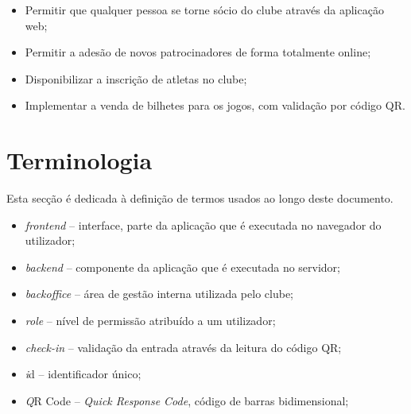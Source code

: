\begin{itemize}
    \item Permitir que qualquer pessoa se torne sócio do clube através da aplicação web;
    \item Permitir a adesão de novos patrocinadores de forma totalmente online;
    \item Disponibilizar a inscrição de atletas no clube;
    \item Implementar a venda de bilhetes para os jogos, com validação por código QR.
\end{itemize}

%
%
\section{Terminologia} \label{sec13}

Esta secção é dedicada à definição de termos usados ao longo deste documento.

\begin{itemize}
    \item \textit{frontend} -- interface, parte da aplicação que é executada no navegador do utilizador;
    \item \textit{backend} -- componente da aplicação que é executada no servidor;
    \item \textit{backoffice} -- área de gestão interna utilizada pelo clube;
    \item \textit{role} -- nível de permissão atribuído a um utilizador;
    \item \textit{check-in} -- validação da entrada através da leitura do código QR;
    \item \textit id -- identificador único;
    \item \textit QR Code -- \textit{Quick Response Code}, código de barras bidimensional;
\end{itemize}